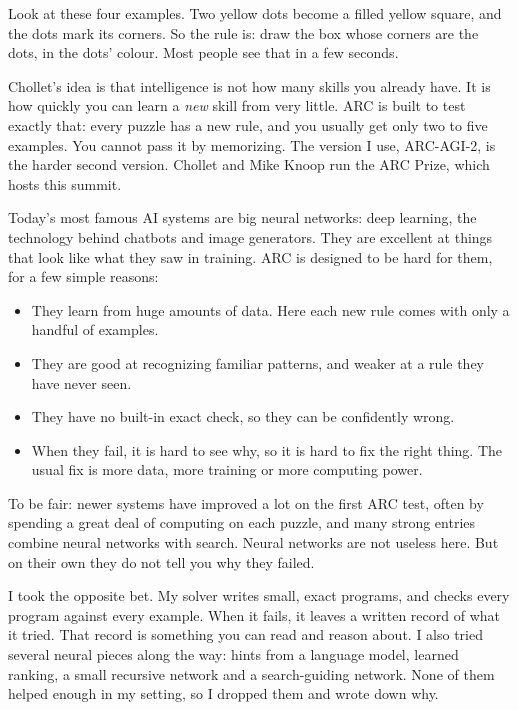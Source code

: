\documentclass[11pt]{article}
\newcommand{\panel}[1]{\par\vspace{0.7em}{\large\bfseries\color{accent}#1}\par\vspace{0.05em}}
\begin{document}
Look at these four examples. Two yellow dots become a filled yellow square, and the dots mark its corners.
So the rule is: draw the box whose corners are the dots, in the dots' colour. Most people see that in a few
seconds.

Chollet's idea is that intelligence is not how many skills you already have. It is how quickly you can
learn a \emph{new} skill from very little. ARC is built to test exactly that: every puzzle has a new rule,
and you usually get only two to five examples. You cannot pass it by memorizing. The version I use, ARC-AGI-2, is
the harder second version. Chollet and Mike Knoop run the ARC Prize, which hosts this summit.

\panel{Where big neural networks struggle}
Today's most famous AI systems are big neural networks: deep learning, the technology behind chatbots and
image generators. They are excellent at things that look like what they saw in training. ARC is designed to
be hard for them, for a few simple reasons:
\begin{itemize}
  \item They learn from huge amounts of data. Here each new rule comes with only a handful of examples.
  \item They are good at recognizing familiar patterns, and weaker at a rule they have never seen.
  \item They have no built-in exact check, so they can be confidently wrong.
  \item When they fail, it is hard to see why, so it is hard to fix the right thing. The usual fix is more
    data, more training or more computing power.
\end{itemize}
To be fair: newer systems have improved a lot on the first ARC test, often by spending a great deal of
computing on each puzzle, and many strong entries combine neural networks with search. Neural networks are
not useless here. But on their own they do not tell you why they failed.

I took the opposite bet. My solver writes small, exact programs, and checks every program against every
example. When it fails, it leaves a written record of what it tried. That record is something you can read
and reason about. I also tried several neural pieces along the way: hints from a language model, learned
ranking, a small recursive network and a search-guiding network. None of them helped enough in my setting,
so I dropped them and wrote down why.
\end{document}
